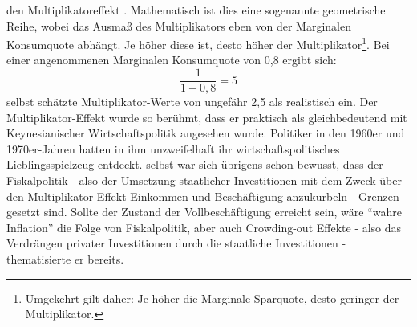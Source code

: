 den Multiplikatoreffekt \parencite[S. 115]{Keynes1936}. Mathematisch ist dies eine sogenannte geometrische Reihe, wobei das Ausmaß des Multiplikators eben von der Marginalen Konsumquote abhängt. Je höher diese ist, desto höher der Multiplikator\footnote{Umgekehrt gilt daher: Je höher die Marginale Sparquote, desto geringer der Multiplikator.}. Bei einer angenommenen Marginalen Konsumquote von 0,8 ergibt sich: $$\frac{1}{1-0,8} = 5$$ \textcite[S. 128]{Keynes1936} selbst schätzte Multiplikator-Werte von ungefähr 2,5 als realistisch ein. Der Multiplikator-Effekt wurde so berühmt, dass er praktisch als gleichbedeutend mit Keynesianischer Wirtschaftspolitik angesehen wurde. Politiker in den 1960er und 1970er-Jahren hatten in ihm unzweifelhaft ihr wirtschaftspolitisches Lieblingsspielzeug entdeckt. \textcite[S. 118ff]{Keynes1936} selbst war sich übrigens schon bewusst, dass der Fiskalpolitik - also der Umsetzung staatlicher Investitionen mit dem Zweck über den Multiplikator-Effekt Einkommen und Beschäftigung anzukurbeln - Grenzen gesetzt sind. Sollte der Zustand der Vollbeschäftigung erreicht sein, wäre "`wahre Inflation"' die Folge von Fiskalpolitik, aber auch Crowding-out Effekte - also das Verdrängen privater Investitionen durch die staatliche Investitionen - thematisierte er bereits.

